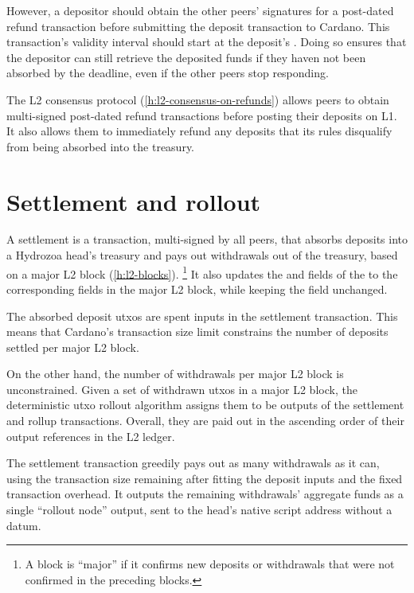 \documentclass[../hydrozoa.tex]{subfiles}
\begin{document}
However, a depositor should obtain the other peers' signatures for a post-dated refund transaction before submitting the deposit transaction to Cardano.
This transaction's validity interval should start at the deposit's .
Doing so ensures that the depositor can still retrieve the deposited funds if they haven not been absorbed by the deadline, even if the other peers stop responding.

The L2 consensus protocol (\cref{h:l2-consensus-on-refunds}) allows peers to obtain multi-signed post-dated refund transactions before posting their deposits on L1.
It also allows them to immediately refund any deposits that its rules disqualify from being absorbed into the treasury.

\section{Settlement and rollout}%
\label{h:l1-multisig-settlement-rollout}%

A settlement is a transaction, multi-signed by all peers, that absorbs deposits into a Hydrozoa head's treasury and pays out withdrawals out of the treasury, based on a major L2 block (\cref{h:l2-blocks}).%
\footnote{A block is ``major'' if it confirms new deposits or withdrawals that were not confirmed in the preceding blocks.}
It also updates the  and  fields of the  to the corresponding fields in the major L2 block, while keeping the  field unchanged.

The absorbed deposit utxos are spent inputs in the settlement transaction.
This means that Cardano's transaction size limit constrains the number of deposits settled per major L2 block.

On the other hand, the number of withdrawals per major L2 block is unconstrained.
Given a set of withdrawn utxos in a major L2 block, the deterministic utxo rollout algorithm assigns them to be outputs of the settlement and rollup transactions.
Overall, they are paid out in the ascending order of their output references in the L2 ledger.


The settlement transaction greedily pays out as many withdrawals as it can, using the transaction size remaining after fitting the deposit inputs and the fixed transaction overhead.
It outputs the remaining withdrawals' aggregate funds as a single ``rollout node'' output, sent to the head's native script address without a datum.
\end{document}

